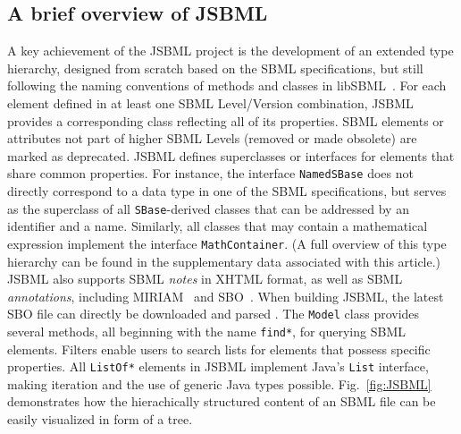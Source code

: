 \documentclass{bioinfo}
\begin{document}
\begin{methods}
\section{A brief overview of JSBML}

A key achievement of the JSBML project is the development of an extended type hierarchy,
designed from scratch based on the SBML specifications, but still
following the naming conventions of methods and classes in libSBML~\citep{Bornstein2008}. For each
element defined in at least one SBML Level/Version combination, JSBML provides a
corresponding class reflecting all of its properties. SBML elements or
attributes not part of higher SBML Levels (removed or made
obsolete) are marked as deprecated. JSBML defines superclasses or
interfaces for elements that share common properties. For instance, the interface
\texttt{NamedSBase} does not directly correspond to a data type in one of the SBML
specifications, but serves as the superclass of all
\texttt{SBase}-derived classes that can be addressed by an identifier and a name. Similarly, all
classes that may contain a mathematical expression implement the
interface \texttt{MathContainer}. (A full overview of this type hierarchy can be
found in the supplementary data associated with this article.) JSBML also
supports SBML \emph{notes} in XHTML format, as well as SBML
\emph{annotations}, including MIRIAM~\citep{Novere2005} and SBO~\citep{Novere2006b}.
When building JSBML, the latest SBO file can directly be downloaded and parsed
\citep{Holland2008}.
The \texttt{Model} class provides several methods, all beginning with the name \texttt{find*},
for querying SBML elements. Filters enable users to search lists for elements
that possess specific properties. All \texttt{ListOf*} elements in JSBML implement Java's
\texttt{List} interface, making iteration and the use of generic Java types possible.
Fig.~\ref{fig:JSBML} demonstrates how the hierachically
structured content of an SBML file can be easily visualized in form of a tree.
\begin{figure}
\centerline{
  }
\end{figure}
\end{methods}
\end{document}
